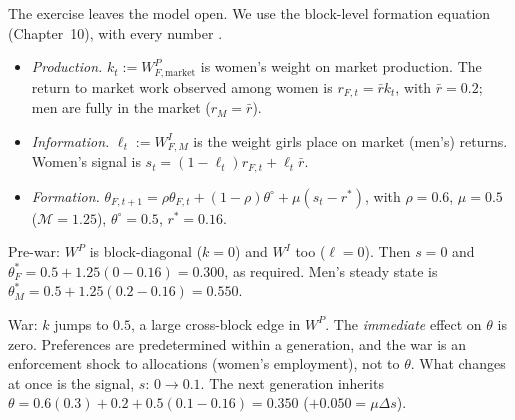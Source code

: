 \documentclass[../solutions_manual.tex]{subfiles}
\begin{document}
The exercise leaves the model open. We use the block-level formation equation (Chapter~10), with every number \illustrative.
\begin{itemize}
\item \emph{Production.} $k_t := W^P_{F,\text{market}}$ is women's weight on market production. The return to market work observed among women is $r_{F,t} = \bar r k_t$, with $\bar r = 0.2$; men are fully in the market ($r_M = \bar r$).
\item \emph{Information.} $\ell_t := W^I_{F,M}$ is the weight girls place on market (men's) returns. Women's signal is $s_t = (1-\ell_t)r_{F,t} + \ell_t\bar r$.
\item \emph{Formation.} $\theta_{F,t+1} = \rho\theta_{F,t} + (1-\rho)\theta^{\circ} + \mu(s_t - r^*)$, with $\rho = 0.6$, $\mu = 0.5$ ($\mathcal{M} = 1.25$), $\theta^{\circ} = 0.5$, $r^* = 0.16$.
\end{itemize}

 Pre-war: $W^P$ is block-diagonal ($k = 0$) and $W^I$ too ($\ell = 0$). Then $s = 0$ and $\theta_F^* = 0.5 + 1.25(0 - 0.16) = 0.300$, as required. Men's steady state is $\theta_M^* = 0.5 + 1.25(0.2 - 0.16) = 0.550$.

 War: $k$ jumps to $0.5$, a large cross-block edge in $W^P$. The \emph{immediate} effect on $\theta$ is zero. Preferences are predetermined within a generation, and the war is an enforcement shock to allocations (women's employment), not to $\theta$. What changes at once is the signal, $s$: $0 \to 0.1$. The next generation inherits $\theta = 0.6(0.3) + 0.2 + 0.5(0.1 - 0.16) = 0.350$ ($+0.050 = \mu\Delta s$).
\end{document}
